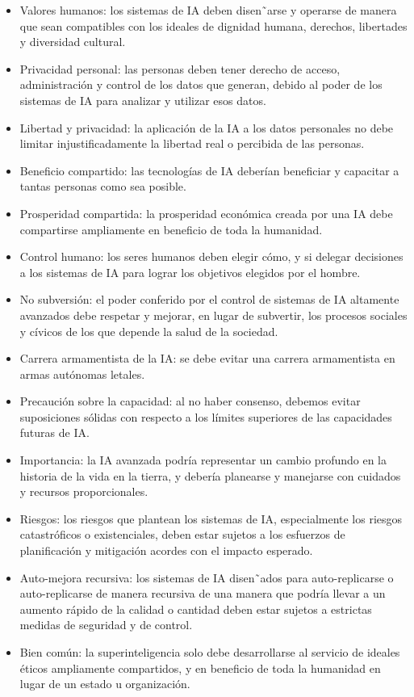 \documentclass[10pt]{article}
\begin{document}
\begin{itemize}
            \item Valores humanos: los sistemas de IA deben disen˜arse y operarse de manera que sean compatibles con los ideales de dignidad humana, derechos, libertades y diversidad cultural.
            \item Privacidad personal: las personas deben tener derecho de acceso, administración y control de los datos que generan, debido al poder de los sistemas de IA para analizar y utilizar esos datos. 
            \item Libertad y privacidad: la aplicación de la IA a los datos personales no debe limitar injustiﬁcadamente la libertad real o percibida de las personas.
            \item Beneﬁcio compartido: las tecnologías de IA deberían beneﬁciar y capacitar a tantas personas como sea posible.
            \item Prosperidad compartida: la prosperidad económica creada por una IA debe compartirse ampliamente en beneﬁcio de toda la humanidad.
            \item Control humano: los seres humanos deben elegir cómo, y si delegar decisiones a los sistemas de IA para lograr los objetivos elegidos por el hombre. 
            \item No subversión: el poder conferido por el control de sistemas de IA altamente avanzados debe respetar y mejorar, en lugar de subvertir, los procesos sociales y cívicos de los que depende la salud de la sociedad.
            \item Carrera armamentista de la IA: se debe evitar una carrera armamentista en armas autónomas letales.
            \item Precaución sobre la capacidad: al no haber consenso, debemos evitar suposiciones sólidas con respecto a los límites superiores de las capacidades futuras de IA.
            \item Importancia: la IA avanzada podría representar un cambio profundo en la historia de la vida en la tierra, y debería planearse y manejarse con cuidados y recursos proporcionales.
            \item Riesgos: los riesgos que plantean los sistemas de IA, especialmente los riesgos catastróﬁcos o existenciales, deben estar sujetos a los esfuerzos de planiﬁcación y mitigación acordes con el impacto esperado.
            \item Auto-mejora recursiva: los sistemas de IA disen˜ados para auto-replicarse o auto-replicarse de manera recursiva de una manera que podría llevar a un aumento rápido de la calidad o cantidad deben estar sujetos a estrictas medidas de seguridad y de control.
            \item Bien común: la superinteligencia solo debe desarrollarse al servicio de ideales éticos ampliamente compartidos, y en beneﬁcio de toda la humanidad en lugar de un estado u organización.\cite{avila-tomas_inteligencia_2021}

        \end{itemize}
\end{document}

